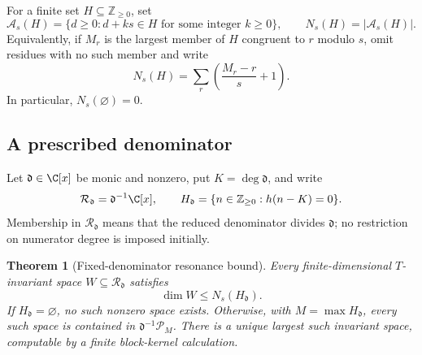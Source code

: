 \documentclass[11pt,a4paper]{article}
\newtheorem{theorem}{Theorem}[section]
\theoremstyle{definition}\newtheorem{definition}[theorem]{Definition}
\theoremstyle{remark}\newtheorem{remark}[theorem]{Remark}
\newcommand{\Pcal}{\mathcal P}\newcommand{\PP}{\mathcal P}\newcommand{\Pp}{\mathcal P}
\numberwithin{equation}{section}
\begin{document}
For a finite set $H\subseteq\mathbb Z_{\ge0}$, set
\[
 \mathcal A_s(H)=\{d\ge0:d+ks\in H\text{ for some integer }k\ge0\},
 \qquad N_s(H)=|\mathcal A_s(H)|.
\]
Equivalently, if $M_r$ is the largest member of $H$ congruent to $r$ modulo
$s$, omit residues with no such member and write
\begin{equation}
 N_s(H)=\sum_r\left(\frac{M_r-r}{s}+1\right).
 \label{ext-heisei-chain-count}
\end{equation}
In particular, $N_s(\varnothing)=0$.

\subsection{A prescribed denominator}

Let $\mathfrak d\in\C[x]$ be monic and nonzero, put $K=\deg\mathfrak d$, and
write
\[
 \mathcal R_{\mathfrak d}=\mathfrak d^{-1}\C[x],
 \qquad
 H_{\mathfrak d}=\{n\in\mathbb Z_{\ge0}:h(n-K)=0\}.
\]
Membership in $\mathcal R_{\mathfrak d}$ means that the reduced denominator
divides $\mathfrak d$; no restriction on numerator degree is imposed initially.

\begin{theorem}[Fixed-denominator resonance bound]
\label{ext-heisei-fixed}
Every finite-dimensional $T$-invariant space
$W\subseteq\mathcal R_{\mathfrak d}$ satisfies
\[
 \dim W\le N_s(H_{\mathfrak d}).
\]
If $H_{\mathfrak d}=\varnothing$, no such nonzero space exists.  Otherwise,
with $M=\max H_{\mathfrak d}$, every such space is contained in
$\mathfrak d^{-1}\Pcal_M$.  There is a unique largest such invariant space,
computable by a finite block-kernel calculation.
\end{theorem}
\end{document}

